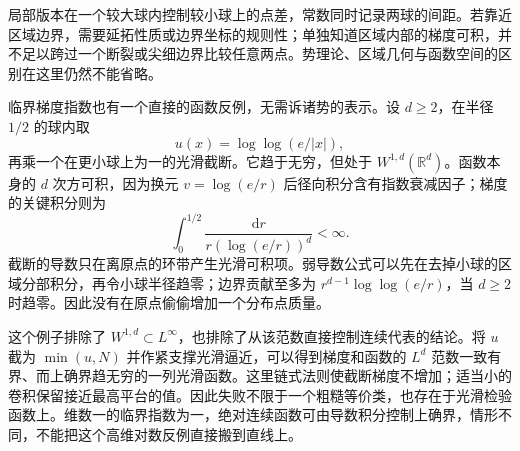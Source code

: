 \ProseParagraphBreak

局部版本在一个较大球内控制较小球上的点差，常数同时记录两球的间距。若靠近区域边界，需要延拓性质或边界坐标的规则性；单独知道区域内部的梯度可积，并不足以跨过一个断裂或尖细边界比较任意两点。势理论、区域几何与函数空间的区别在这里仍然不能省略。

\ProseParagraphBreak

临界梯度指数也有一个直接的函数反例，无需诉诸势的表示。设 \(d\geq2\)，在半径 \(1/2\) 的球内取
\[
 u(x)=\log\log(e/|x|),
\]
再乘一个在更小球上为一的光滑截断。它趋于无穷，但处于 \(W^{1,d}(\mathbb R^d)\)。函数本身的 \(d\) 次方可积，因为换元 \(v=\log(e/r)\) 后径向积分含有指数衰减因子；梯度的关键积分则为
\[
 \int_0^{1/2}\frac{\mathrm dr}
 {r(\log(e/r))^d}<\infty.
\]
截断的导数只在离原点的环带产生光滑可积项。弱导数公式可以先在去掉小球的区域分部积分，再令小球半径趋零；边界贡献至多为 \(r^{d-1}\log\log(e/r)\)，当 \(d\geq2\) 时趋零。因此没有在原点偷偷增加一个分布点质量。

\ProseParagraphBreak

这个例子排除了 \(W^{1,d}\subset L^\infty\)，也排除了从该范数直接控制连续代表的结论。将 \(u\) 截为 \(\min(u,N)\) 并作紧支撑光滑逼近，可以得到梯度和函数的 \(L^d\) 范数一致有界、而上确界趋无穷的一列光滑函数。这里链式法则使截断梯度不增加；适当小的卷积保留接近最高平台的值。因此失败不限于一个粗糙等价类，也存在于光滑检验函数上。维数一的临界指数为一，绝对连续函数可由导数积分控制上确界，情形不同，不能把这个高维对数反例直接搬到直线上。
